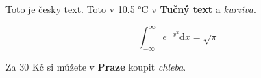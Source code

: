 

Toto je česky text. Toto v 10.5 °C v \textbf{Tučný text} a \textit{kurzíva}.

\[
	\int_{-\infty}^{\infty} e^{-x^2} \mathrm{d}x = \sqrt{\pi}
\]

Za 30 Kč si můžete v \textbf{Praze} koupit \textit{chleba}.

\bye
